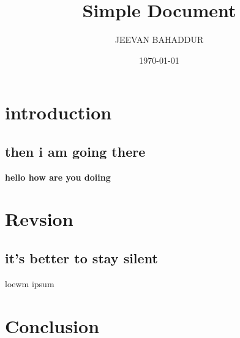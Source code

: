 \documentclass[12pt,a4paper]{report}
\author{JEEVAN BAHADDUR}
\title{Simple Document}
\date{\today}
\begin{document}
\maketitle

\tableofcontents

\chapter{introduction}
\section {then i am going there}
\textbf {hello how are you doiing}
\chapter{Revsion}
\section{it's better to stay silent}
loewm ipsum
\chapter{Conclusion}
\end{document}

